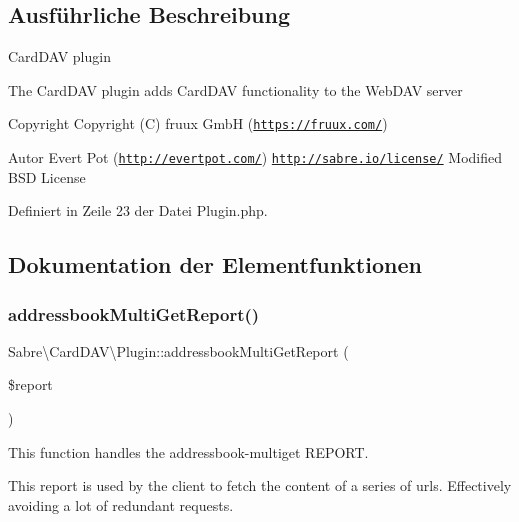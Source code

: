 \subsection{Ausführliche Beschreibung}
Card\+D\+AV plugin

The Card\+D\+AV plugin adds Card\+D\+AV functionality to the Web\+D\+AV server

\begin{DoxyCopyright}{Copyright}
Copyright (C) fruux GmbH (\href{https://fruux.com/}{\tt https\+://fruux.\+com/}) 
\end{DoxyCopyright}
\begin{DoxyAuthor}{Autor}
Evert Pot (\href{http://evertpot.com/}{\tt http\+://evertpot.\+com/})  \href{http://sabre.io/license/}{\tt http\+://sabre.\+io/license/} Modified B\+SD License 
\end{DoxyAuthor}


Definiert in Zeile 23 der Datei Plugin.\+php.



\subsection{Dokumentation der Elementfunktionen}
\mbox{\label{class_sabre_1_1_card_d_a_v_1_1_plugin_aeabe6cede7304e451c9d84c803ad0796}} 
\subsubsection{\texorpdfstring{addressbook\+Multi\+Get\+Report()}{addressbookMultiGetReport()}}
{\footnotesize\ttfamily Sabre\textbackslash{}\+Card\+D\+A\+V\textbackslash{}\+Plugin\+::addressbook\+Multi\+Get\+Report (\begin{DoxyParamCaption}\item[{}]{\$report }\end{DoxyParamCaption})}

This function handles the addressbook-\/multiget R\+E\+P\+O\+RT.

This report is used by the client to fetch the content of a series of urls. Effectively avoiding a lot of redundant requests.


